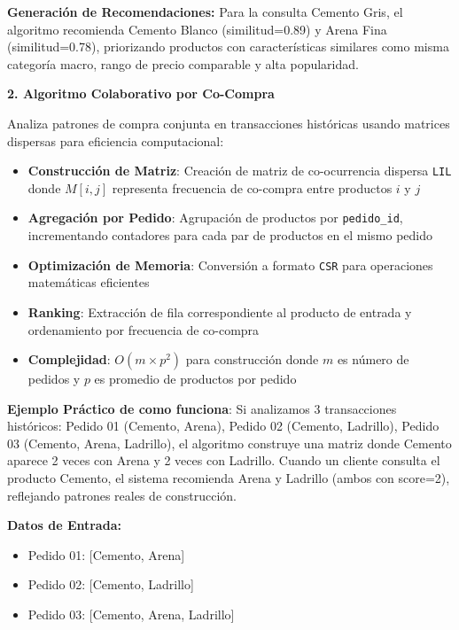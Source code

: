 \documentclass[twocolumn]{article}
\begin{document}
\textbf{Generación de Recomendaciones:}
Para la consulta Cemento Gris, el algoritmo recomienda Cemento Blanco (similitud=0.89) y Arena Fina (similitud=0.78), priorizando productos con características similares como misma categoría macro, rango de precio comparable y alta popularidad.

\vspace{0.3cm}

\textbf{2. Algoritmo Colaborativo por Co-Compra}

Analiza patrones de compra conjunta en transacciones históricas usando matrices dispersas para eficiencia computacional:

\begin{itemize}
    \item \textbf{Construcción de Matriz}: Creación de matriz de co-ocurrencia dispersa \texttt{LIL} donde \(M[i,j]\) representa frecuencia de co-compra entre productos \(i\) y \(j\)
    \item \textbf{Agregación por Pedido}: Agrupación de productos por \texttt{pedido\_id}, incrementando contadores para cada par de productos en el mismo pedido
    \item \textbf{Optimización de Memoria}: Conversión a formato \texttt{CSR} para operaciones matemáticas eficientes
    \item \textbf{Ranking}: Extracción de fila correspondiente al producto de entrada y ordenamiento por frecuencia de co-compra
    \item \textbf{Complejidad}: \(O(m \times p^2)\) para construcción donde \(m\) es número de pedidos y \(p\) es promedio de productos por pedido
\end{itemize}

\textbf{Ejemplo Práctico de como funciona}: Si analizamos 3 transacciones históricos: Pedido 01 (Cemento, Arena), Pedido 02 (Cemento, Ladrillo), Pedido 03 (Cemento, Arena, Ladrillo), el algoritmo construye una matriz donde Cemento aparece 2 veces con Arena y 2 veces con Ladrillo. Cuando un cliente consulta el producto Cemento, el sistema recomienda Arena y Ladrillo (ambos con score=2), reflejando patrones reales de construcción.

\vspace{0.3cm}

\textbf{Datos de Entrada:}
\begin{itemize}
    \item Pedido 01: [Cemento, Arena]
    \item Pedido 02: [Cemento, Ladrillo]  
    \item Pedido 03: [Cemento, Arena, Ladrillo]
\end{itemize}
\end{document}
